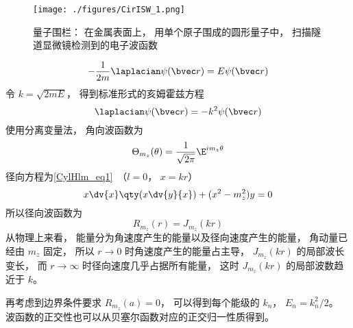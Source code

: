 
\begin{issues}
\issueDraft
\end{issues}


\begin{figure}[ht]
\centering
\texttt{[image: ./figures/CirISW\_1.png]}
\caption{量子围栏： 在金属表面上， 用单个原子围成的圆形量子中， 扫描隧道显微镜检测到的电子波函数} \label{CirISW_fig1}
\end{figure}

\begin{equation}
-\frac{1}{2m}\laplacian \psi(\bvec r) = E\psi(\bvec r)
\end{equation}
令 $k = \sqrt{2mE}$， 得到标准形式的亥姆霍兹方程
\begin{equation}
\laplacian \psi(\bvec r) = -k^2\psi(\bvec r)
\end{equation}
使用分离变量法， 角向波函数为
\begin{equation}
\Theta_{m_z}(\theta) = \frac{1}{\sqrt{2\pi}} \E^{im_z \theta}
\end{equation}
径向方程为\autoref{CylHlm_eq1}~（$l = 0$， $x = kr$）
\begin{equation}
x \dv{x} \qty(x\dv{y}{x}) + (x^2 - m_z^2)y = 0
\end{equation}
所以径向波函数为
\begin{equation}
R_{m_z}(r) = J_{m_z}(kr)
\end{equation}
从物理上来看， 能量分为角速度产生的能量以及径向速度产生的能量， 角动量已经由 $m_z$ 固定， 所以 $r \to 0$ 时角速度产生的能量占主导， $J_{m_z}(kr)$ 的局部波长变长， 而 $r\to \infty$ 时径向速度几乎占据所有能量， 这时 $J_{m_z}(kr)$ 的局部波数趋近于 $k$。

再考虑到边界条件要求 $R_{m_z}(a)  = 0$， 可以得到每个能级的 $k_n$， $E_n = k_n^2/2$。 波函数的正交性也可以从贝塞尔函数对应的正交归一性质得到。
